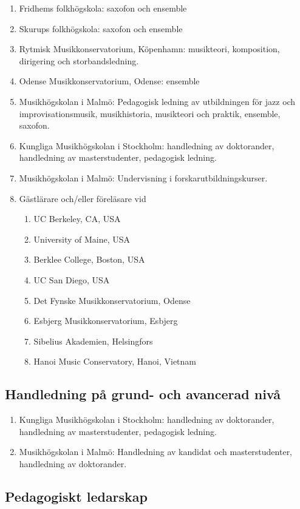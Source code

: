 \begin{enumerate}
\item Fridhems folkhögskola: saxofon och ensemble
\item Skurups folkhögskola: saxofon och ensemble
\item Rytmisk Musikkonservatorium, Köpenhamn: musikteori, komposition, dirigering och storbandsledning.
\item Odense Musikkonservatorium, Odense: ensemble
\item Musikhögskolan i Malmö: Pedagogisk ledning av utbildningen för jazz och improvisationsmusik, musikhistoria, musikteori och praktik, ensemble, saxofon.
\item Kungliga Musikhögskolan i Stockholm: handledning av doktorander, handledning av masterstudenter, pedagogisk ledning.
\item Musikhögskolan i Malmö: Undervisning i forskarutbildningskurser.
\item Gästlärare och/eller föreläsare vid 
  \begin{enumerate}
  \item UC Berkeley, CA, USA
  \item University of Maine, USA
  \item Berklee College, Boston, USA
  \item UC San Diego, USA
  \item Det Fynske Musikkonservatorium, Odense
  \item Esbjerg Musikkonservatorium, Esbjerg
  \item Sibelius Akademien, Helsingfors
  \item Hanoi Music Conservatory, Hanoi, Vietnam
  \end{enumerate}
\end{enumerate}

\subsection*{\textsf{Handledning på grund- och avancerad nivå}}

\begin{enumerate}
\item Kungliga Musikhögskolan i Stockholm: handledning av
  doktorander, handledning av masterstudenter, pedagogisk ledning.
\item Musikhögskolan i Malmö: Handledning av kandidat och
  masterstudenter, handledning av doktorander.
\end{enumerate}


\subsection*{\textsf{Pedagogiskt ledarskap}}

